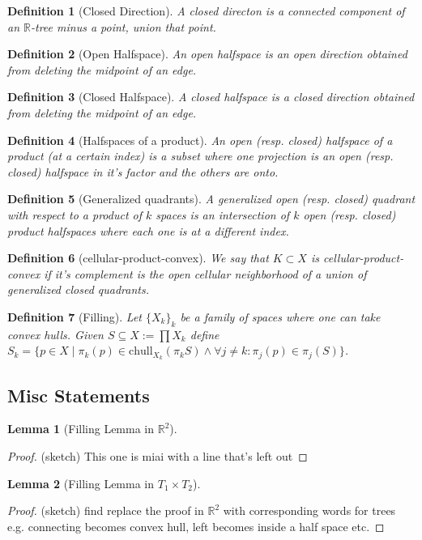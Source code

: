 \documentclass{article}
\theoremstyle{mystyle}
\newtheorem{lem}{Lemma}[section]
\newtheorem{defn}{Definition}
\theoremstyle{remark}
\begin{document}
\begin{defn}[Closed Direction] A closed directon is a connected component of an \(\mathbb{R}\)-tree minus a point, union that point.
\end{defn}
\begin{defn}[Open Halfspace] An open halfspace is an open direction obtained from deleting the midpoint of an edge.
\end{defn}
\begin{defn}[Closed Halfspace] A closed halfspace is a closed direction obtained from deleting the midpoint of an edge.
\end{defn}
\begin{defn}[Halfspaces of a product] An open (resp. closed) halfspace of a product (at a certain index) is a subset where one projection is an open (resp. closed)  halfspace in it's factor and the others are onto.
\end{defn}
\begin{defn}[Generalized quadrants] A generalized open (resp. closed) quadrant with respect to a product of \(k\) spaces is an intersection of \(k\) open (resp. closed) product halfspaces where each one is at a different index.
\end{defn}
\begin{defn}[cellular-product-convex] We say that \(K \subset X\) is cellular-product-convex if it's complement is the open cellular neighborhood of a union of generalized closed quadrants.
\end{defn}

\begin{defn}
	[Filling]
	Let \(\{X_{k}\}_{k}\) be a family of spaces where one can take convex hulls. Given \(S \subseteq X := \prod X_{k}\) define \(S_{k} = \{p \in X \mid \pi_{k} (p) \in \text{chull}_{X_{k}}  (\pi_{k} S)\wedge \forall j\neq k: \pi_{j} (p) \in \pi_{j} (S) \} \).
\end{defn}

\subsection{Misc Statements}

\begin{lem}
    [Filling Lemma in \(\mathbb{R}^{2}\)]
	\label{lem:fillr2}
\end{lem}
\begin{proof}
    (sketch) This one is miai with a line that's left out
\end{proof}
\begin{lem}
    [Filling Lemma in \(T_{1} \times T_{2}\)]
	\label{lem:fillt2}
\end{lem}
\begin{proof}
    (sketch) find replace the proof in \(\mathbb{R}^{2}\) with corresponding words for trees e.g. connecting becomes convex hull, left becomes inside a half space etc.
\end{proof}
\end{document}
